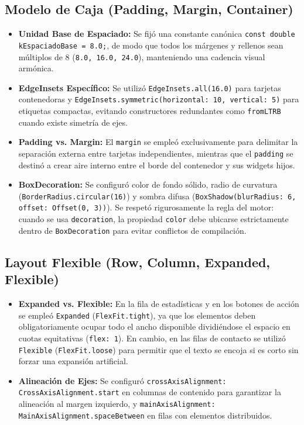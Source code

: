 \documentclass[12pt,a4paper]{article}
\begin{document}
\subsection{Modelo de Caja (Padding, Margin, Container)}
\begin{itemize}[leftmargin=*]
    \item \textbf{Unidad Base de Espaciado:} Se fijó una constante canónica \texttt{const double kEspaciadoBase = 8.0;}, de modo que todos los márgenes y rellenos sean múltiplos de 8 (\texttt{8.0, 16.0, 24.0}), manteniendo una cadencia visual armónica.
    \item \textbf{EdgeInsets Específico:} Se utilizó \texttt{EdgeInsets.all(16.0)} para tarjetas contenedoras y \texttt{EdgeInsets.symmetric(horizontal: 10, vertical: 5)} para etiquetas compactas, evitando constructores redundantes como \texttt{fromLTRB} cuando existe simetría de ejes.
    \item \textbf{Padding vs. Margin:} El \texttt{margin} se empleó exclusivamente para delimitar la separación externa entre tarjetas independientes, mientras que el \texttt{padding} se destinó a crear aire interno entre el borde del contenedor y sus widgets hijos.
    \item \textbf{BoxDecoration:} Se configuró color de fondo sólido, radio de curvatura (\texttt{BorderRadius.circular(16)}) y sombra difusa (\texttt{BoxShadow(blurRadius: 6, offset: Offset(0, 3))}). Se respetó rigurosamente la regla del motor: cuando se usa \texttt{decoration}, la propiedad \texttt{color} debe ubicarse estrictamente dentro de \texttt{BoxDecoration} para evitar conflictos de compilación.
\end{itemize}

\subsection{Layout Flexible (Row, Column, Expanded, Flexible)}
\begin{itemize}[leftmargin=*]
    \item \textbf{Expanded vs. Flexible:} En la fila de estadísticas y en los botones de acción se empleó \texttt{Expanded} (\texttt{FlexFit.tight}), ya que los elementos deben obligatoriamente ocupar todo el ancho disponible dividiéndose el espacio en cuotas equitativas (\texttt{flex: 1}). En cambio, en las filas de contacto se utilizó \texttt{Flexible} (\texttt{FlexFit.loose}) para permitir que el texto se encoja si es corto sin forzar una expansión artificial.
    \item \textbf{Alineación de Ejes:} Se configuró \texttt{crossAxisAlignment: CrossAxisAlignment.start} en columnas de contenido para garantizar la alineación al margen izquierdo, y \texttt{mainAxisAlignment: MainAxisAlignment.spaceBetween} en filas con elementos distribuidos.
\end{itemize}
\end{document}
